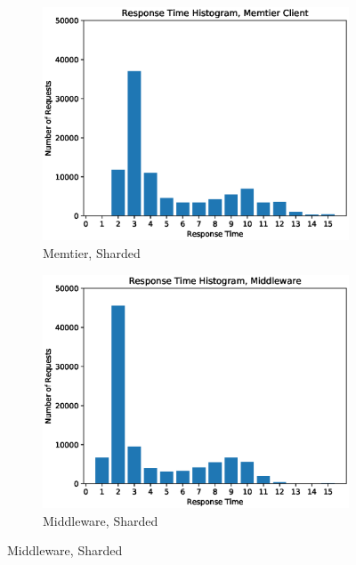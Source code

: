 \documentclass[11pt,a4paper]{article}
\begin{document}
\begin{figure}
    \begin{subfigure}{.5\textwidth}
        \includegraphics[width=1\linewidth]{plots/logSection5c_histogramMemtier.eps}
        \caption{Memtier, Sharded}
    \end{subfigure}
    \begin{subfigure}{.5\textwidth}
        \includegraphics[width=1\linewidth]{plots/logSection5c_histogramMiddleware.eps}
        \caption{Middleware, Sharded}
    \end{subfigure}


\end{figure}
\end{document}
